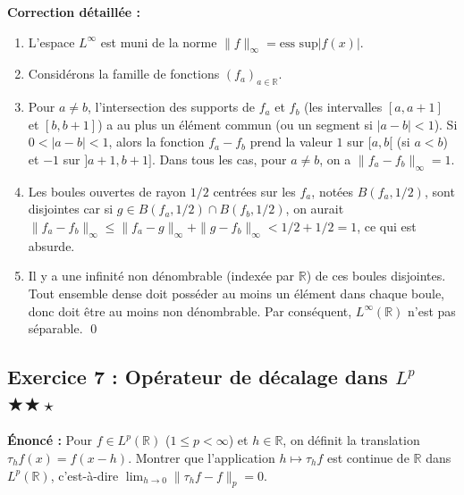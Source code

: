 \documentclass[11pt,a4paper]{article}
\begin{document}
\textbf{Correction détaillée :}
\begin{enumerate}
\item L'espace $L^\infty$ est muni de la norme $\|f\|_\infty = \text{ess sup} |f(x)|$.
\item Considérons la famille de fonctions $(f_a)_{a \in \mathbb{R}}$.
\item Pour $a \neq b$, l'intersection des supports de $f_a$ et $f_b$ (les intervalles $[a, a+1]$ et $[b, b+1]$) a au plus un élément commun (ou un segment si $|a-b|<1$). Si $0 < |a-b| < 1$, alors la fonction $f_a - f_b$ prend la valeur $1$ sur $[a, b[$ (si $a<b$) et $-1$ sur $]a+1, b+1]$.
   Dans tous les cas, pour $a \neq b$, on a $\|f_a - f_b\|_\infty = 1$.
\item Les boules ouvertes de rayon $1/2$ centrées sur les $f_a$, notées $B(f_a, 1/2)$, sont disjointes car si $g \in B(f_a, 1/2) \cap B(f_b, 1/2)$, on aurait $\|f_a - f_b\|_\infty \le \|f_a - g\|_\infty + \|g - f_b\|_\infty < 1/2 + 1/2 = 1$, ce qui est absurde.
\item Il y a une infinité non dénombrable (indexée par $\mathbb{R}$) de ces boules disjointes. Tout ensemble dense doit posséder au moins un élément dans chaque boule, donc doit être au moins non dénombrable.
   Par conséquent, $L^\infty(\mathbb{R})$ n'est pas séparable. \qed
\end{enumerate}


\subsection*{Exercice 7 : Opérateur de décalage dans $L^p$ \quad $\bigstar\bigstar\star$}
\textbf{Énoncé :}
Pour $f \in L^p(\mathbb{R})$ ($1 \le p < \infty$) et $h \in \mathbb{R}$, on définit la translation $\tau_h f(x) = f(x-h)$.
Montrer que l'application $h \mapsto \tau_h f$ est continue de $\mathbb{R}$ dans $L^p(\mathbb{R})$, c'est-à-dire $\lim_{h \to 0} \|\tau_h f - f\|_p = 0$.
\end{document}
